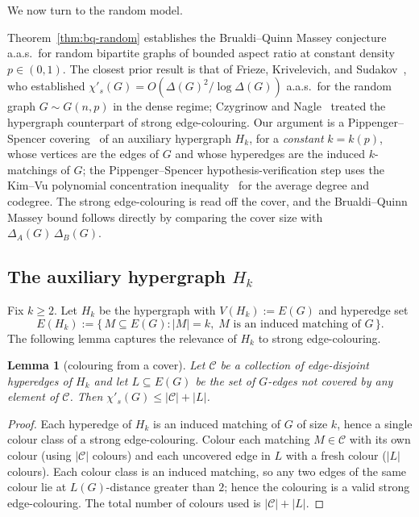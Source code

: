 \documentclass[11pt,a4paper]{article}
\newtheorem{lemma}[theorem]{Lemma}
\theoremstyle{definition}
\theoremstyle{remark}
\begin{document}
We now turn to the random model.

Theorem~\ref{thm:bq-random} establishes the Brualdi--Quinn Massey
conjecture~\cite{brualdiIncidenceStrongEdge1993} a.a.s.\ for random
bipartite graphs of bounded aspect ratio at constant density
$p \in (0, 1)$. The closest prior result
is that of Frieze, Krivelevich, and
Sudakov~\cite{friezeKrivelevichSudakovStrongChromaticIndex2005}, who
established $\chi'_s(G) = O(\Delta(G)^2 / \log \Delta(G))$ a.a.s.\
for the random graph $G \sim G(n, p)$ in the dense regime; Czygrinow
and Nagle~\cite{czygrinowNagleStrongEdgeColorings2002} treated the
hypergraph counterpart of strong edge-colouring.
Our argument is a Pippenger--Spencer
covering~\cite{kahnAsymptoticEdgeColoring1996} of an auxiliary
hypergraph $H_k$, for a \emph{constant} $k = k(p)$, whose vertices
are the edges of $G$ and whose hyperedges are the induced
$k$-matchings of $G$; the Pippenger--Spencer
hypothesis-verification step uses the Kim--Vu polynomial
concentration inequality~\cite{kimVuConcentration2000} for the
average degree and codegree. The strong edge-colouring is read off
the cover, and the Brualdi--Quinn Massey bound follows directly by
comparing the cover size with $\Delta_A(G)\,\Delta_B(G)$.

\subsection{The auxiliary hypergraph $H_k$}

Fix $k \geq 2$. Let $H_k$ be the hypergraph with
$V(H_k) := E(G)$ and hyperedge set
\[
E(H_k) := \bigl\{\, M \subseteq E(G) :
|M| = k,\;
M \text{ is an induced matching of } G \,\bigr\}.
\]
The following lemma captures the relevance of $H_k$ to strong
edge-colouring.

\begin{lemma}[colouring from a cover]
\label{lem:colour-from-cover}
Let $\mathcal{C}$ be a collection of edge-disjoint hyperedges of
$H_k$ and let $L \subseteq E(G)$ be the set of $G$-edges not covered
by any element of $\mathcal{C}$. Then
$\chi'_s(G) \leq |\mathcal{C}| + |L|$.
\end{lemma}

\begin{proof}
Each hyperedge of $H_k$ is an induced matching of $G$ of size $k$,
hence a single colour class of a strong edge-colouring. Colour each
matching $M \in \mathcal{C}$ with its own colour (using
$|\mathcal{C}|$ colours) and each uncovered edge in $L$ with a fresh
colour ($|L|$ colours). Each colour class is an induced matching, so any two edges of the
same colour lie at $L(G)$-distance greater than $2$; hence the
colouring is a valid strong edge-colouring. The total
number of colours used is $|\mathcal{C}| + |L|$.
\end{proof}
\end{document}
